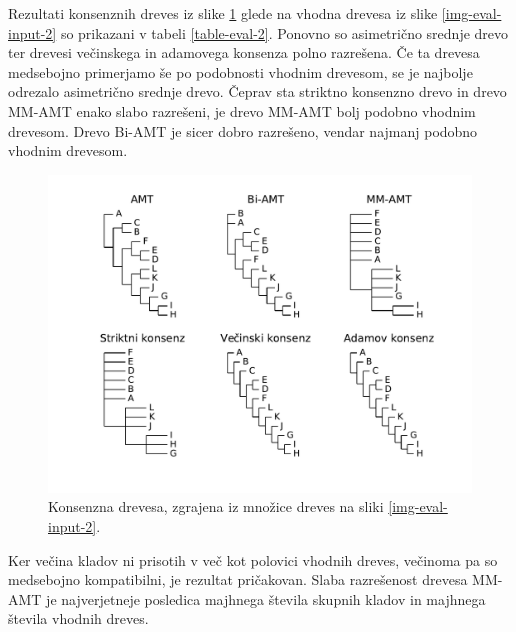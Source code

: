 \documentclass[a4paper, 12pt]{book}
\begin{document}
Rezultati konsenznih dreves iz slike \ref{img-eval-result-2} glede na vhodna drevesa iz slike \ref{img-eval-input-2} so prikazani v tabeli \ref{table-eval-2}. Ponovno so asimetrično srednje drevo ter drevesi večinskega in adamovega konsenza polno razrešena. Če ta drevesa medsebojno primerjamo še po podobnosti vhodnim drevesom, se je najbolje odrezalo asimetrično srednje drevo. Čeprav sta striktno konsenzno drevo in drevo MM-AMT enako slabo razrešeni, je drevo MM-AMT bolj podobno vhodnim drevesom. Drevo Bi-AMT je sicer dobro razrešeno, vendar 
najmanj podobno vhodnim drevesom. 

\begin{figure}[h!]
	\begin{center}
		\includegraphics[scale=0.65, clip=true, trim=1.5cm 1.5cm 1cm 0.8cm]{gfx/eval_gfx_2.pdf}
	\end{center}
	\caption{Konsenzna drevesa, zgrajena iz množice dreves na sliki \ref{img-eval-input-2}.}
	\label{img-eval-result-2}
\end{figure}

Ker večina kladov ni prisotih v več kot polovici vhodnih dreves, večinoma pa so medsebojno kompatibilni, je rezultat pričakovan. Slaba razrešenost drevesa MM-AMT je najverjetneje posledica majhnega števila skupnih kladov in majhnega števila vhodnih dreves.   
\end{document}
